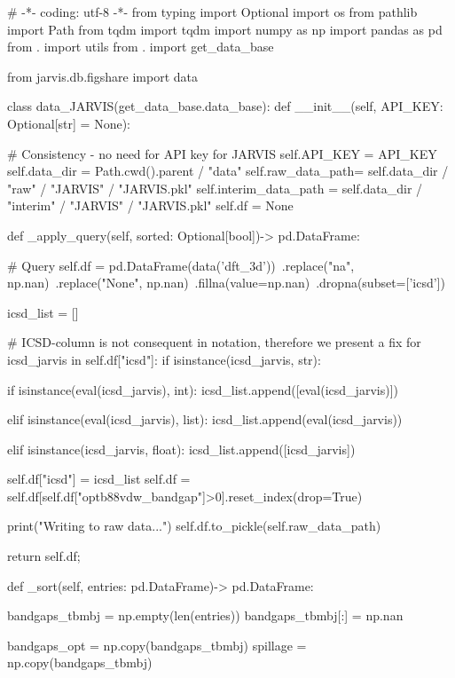 # -*- coding: utf-8 -*-
from typing import Optional
import os
from pathlib import Path
from tqdm import tqdm
import numpy as np
import pandas as pd
from . import utils
from . import get_data_base

from jarvis.db.figshare import data

class data_JARVIS(get_data_base.data_base):
    def __init__(self, API_KEY: Optional[str] = None):

        # Consistency - no need for API key for JARVIS
        self.API_KEY = API_KEY
        self.data_dir = Path.cwd().parent / "data"
        self.raw_data_path= self.data_dir / "raw" / "JARVIS" / "JARVIS.pkl"
        self.interim_data_path = self.data_dir / "interim" / "JARVIS" / "JARVIS.pkl"
        self.df = None

    def _apply_query(self, sorted: Optional[bool])-> pd.DataFrame:

        # Query
        self.df = pd.DataFrame(data('dft_3d'))\
                               .replace("na", np.nan)\
                               .replace("None", np.nan)\
                               .fillna(value=np.nan)\
                               .dropna(subset=['icsd'])

        icsd_list = []

        # ICSD-column is not consequent in notation, therefore we present a fix
        for icsd_jarvis in self.df["icsd"]:
            if isinstance(icsd_jarvis, str):

                if isinstance(eval(icsd_jarvis), int):
                    icsd_list.append([eval(icsd_jarvis)])

                elif isinstance(eval(icsd_jarvis), list):
                    icsd_list.append(eval(icsd_jarvis))

            elif isinstance(icsd_jarvis, float):
                icsd_list.append([icsd_jarvis])

        self.df["icsd"] = icsd_list
        self.df = self.df[self.df["optb88vdw_bandgap"]>0].reset_index(drop=True)

        print("Writing to raw data...")
        self.df.to_pickle(self.raw_data_path)

        return self.df;

    def _sort(self, entries: pd.DataFrame)-> pd.DataFrame:

        bandgaps_tbmbj = np.empty(len(entries))
        bandgaps_tbmbj[:] = np.nan

        bandgaps_opt = np.copy(bandgaps_tbmbj)
        spillage    = np.copy(bandgaps_tbmbj)

